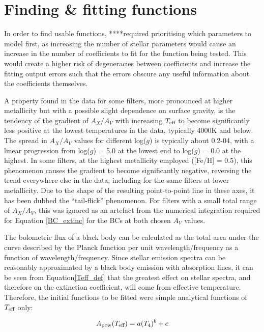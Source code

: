 \documentclass[12pt, a4paper]{report}
\begin{document}
\section{Finding \& fitting functions} \label{find_fit}
In order to find usable functions, ****required prioritising which parameters to model first, as increasing the number of stellar parameters would cause an increase in the number of coefficients to fit for the function being tested. This would create a higher risk of degeneracies between coefficients and increase the fitting output errors such that the errors obscure any useful information about the coefficients themselves.

A property found in the data for some filters, more pronounced at higher metallicity but with a possible slight dependence on surface gravity, is the tendency of the gradient of $A_{X}/A_{V}$ with increasing $T_{\textnormal{eff}}$ to become significantly less positive at the lowest temperatures in the data, typically 4000K and below. The spread in $A_{X}/A_{V}$ values for different log($g$) is typically about 0.2-04, with a linear progression from log($g$) = 5.0 at the lowest end to log($g$) = 0.0 at the highest. In some filters, at the highest metallicity employed ([Fe/H] = 0.5), this phenomenon causes the gradient to become significantly negative, reversing the trend everywhere else in the data, including for the same filters at lower metallicity. Due to the shape of the resulting point-to-point line in these axes, it has been dubbed the ``tail-flick'' phenomenon. For filters with a small total range of $A_{X}/A_{V}$, this was ignored as an artefact from the numerical integration required for Equation \ref{BC_extinc} for the BCs at both chosen $A_{V}$ values.

The bolometric flux of a black body can be calculated as the total area under the curve described by the Planck function per unit wavelength/frequency as a function of wavelength/frequency. Since stellar emission spectra can be reasonably approximated by a black body emission with absorption lines, it can be seen from Equation\ref{Teff_def} that the greatest effect on stellar spectra, and therefore on the extinction coefficient, will come from effective temperature. Therefore, the initial functions to be fitted were simple analytical functions of $T_{\textnormal{eff}}$ only:

\begin{equation}
A_{\textnormal{pow}} (T_{\textnormal{eff}}) = a (T_{4})^{b} + c
\label{Teff_pow}
\end{equation}
\end{document}
